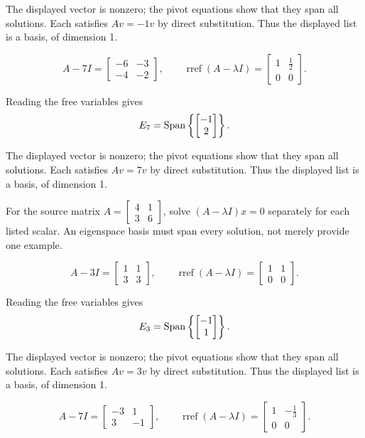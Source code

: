 The displayed vector is nonzero; the pivot equations show that they span all solutions. Each satisfies $Av=-1v$ by direct substitution. Thus the displayed list is a basis, of dimension 1.

\[ A-7I=\begin{bmatrix}-6 & -3\\-4 & -2\end{bmatrix},\qquad\operatorname{rref}(A-\lambda I)=\begin{bmatrix}1 & \frac{1}{2}\\0 & 0\end{bmatrix}.\]

Reading the free variables gives
\[ E_{7}=\operatorname{Span}\left\{\begin{bmatrix}-1\\2\end{bmatrix}\right\}.\]

The displayed vector is nonzero; the pivot equations show that they span all solutions. Each satisfies $Av=7v$ by direct substitution. Thus the displayed list is a basis, of dimension 1.

For the source matrix $A=\begin{bmatrix}4 & 1\\3 & 6\end{bmatrix}$, solve $(A-\lambda I)x=0$ separately for each listed scalar. An eigenspace basis must span every solution, not merely provide one example.

\[ A-3I=\begin{bmatrix}1 & 1\\3 & 3\end{bmatrix},\qquad\operatorname{rref}(A-\lambda I)=\begin{bmatrix}1 & 1\\0 & 0\end{bmatrix}.\]

Reading the free variables gives
\[ E_{3}=\operatorname{Span}\left\{\begin{bmatrix}-1\\1\end{bmatrix}\right\}.\]

The displayed vector is nonzero; the pivot equations show that they span all solutions. Each satisfies $Av=3v$ by direct substitution. Thus the displayed list is a basis, of dimension 1.

\[ A-7I=\begin{bmatrix}-3 & 1\\3 & -1\end{bmatrix},\qquad\operatorname{rref}(A-\lambda I)=\begin{bmatrix}1 & - \frac{1}{3}\\0 & 0\end{bmatrix}.\]

